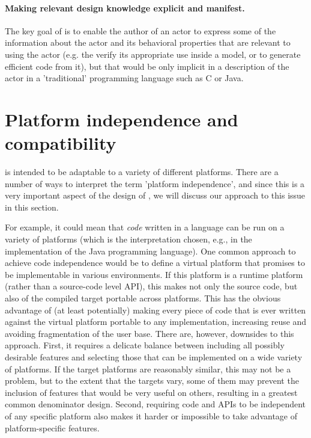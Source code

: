\paragraph{Making relevant design knowledge explicit and manifest.}
The key goal of \Cal is to enable the author of an actor to
express some of the information about the actor and its behavioral
properties that are relevant to using the actor (e.g. the verify its
appropriate use inside a model, or to generate efficient code from
it), but that would be only implicit in a description of the actor in
a 'traditional' programming language such as C or Java.

\section{Platform independence and compatibility}


\Cal is intended to be adaptable  to a variety of different platforms. There are a
number of ways to interpret the term 'platform independence', and
since this is a very important aspect of the design of \Cal, we
will discuss our approach to this issue in this section.

For example, it could mean that {\em code} written in a
language can be run on a variety of
platforms (which is the interpretation chosen, e.g., in the
implementation of the Java programming language). One common approach
to achieve code independence would be to define a virtual platform
that promises to be implementable in various environments. If this
platform is a runtime platform (rather than a source-code level API),
this makes not only the source code,
 but also of the compiled target portable across
platforms. This has the obvious advantage of (at least potentially)
making every piece of code that is ever written against the virtual
platform portable to any implementation, increasing reuse and avoiding
fragmentation of the user base. There are, however, downsides to this
approach. First, it requires a delicate balance between including all
possibly desirable features and selecting those that can be
implemented on a wide variety of platforms. If the target platforms
are reasonably similar, this may not be a problem, but to the extent
that the targets vary, some of them may prevent the inclusion of
features that would be very useful on others, resulting in a greatest
common denominator design. Second, requiring code and APIs to be
independent of any specific platform also makes it harder or
impossible to take advantage of platform-specific features.

